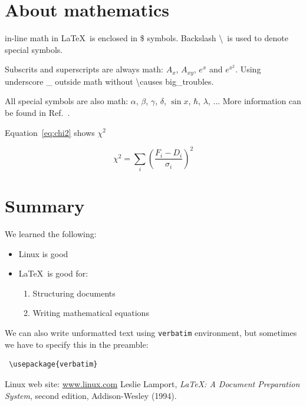 \documentclass[a4paper,10pt,twoside]{article}
\begin{document}
 \newpage


  \section{About mathematics}
  \label{sec:math}
  
  in-line math in \LaTeX \ is enclosed in \$ symbols. Backslash \textbackslash \ is used to denote special symbols. 
  
  Subscrits and superscripts are always math: $A_x$, $A_{xy}$, $e^x$ and $e^{x^2}$. Using underscore \_ outside math without \textbackslash causes big\_troubles.
  
  All special symbols are also math: $\alpha$, $\beta$, $\gamma$, $\delta$, $\sin x$, $\hbar$, $\lambda$, $\ldots$ More information can be found in Ref.~\cite{latex}.
  
  Equation~\ref{eq:chi2} shows $\chi^2$
  
  \begin{equation}
   \label{eq:chi2}
    \chi^2 = \sum\limits_i \left(\frac{F_i-D_i}{\sigma_i}\right)^2
  \end{equation}

 \section{Summary}
  \label{sec:sum}
   We learned the following:
   \begin{itemize}
    \item Linux is good
    \item \LaTeX \ is good for:
    \begin{enumerate}
     \item Structuring documents
     \item Writing mathematical equations
    \end{enumerate}

   \end{itemize}

We can also write unformatted text using \texttt{verbatim} environment, but sometimes we have to specify this in the preamble:
\begin{verbatim}
 \usepackage{verbatim}
\end{verbatim}

   
   
 \begin{thebibliography}{99}
   Linux web site: \url{www.linux.com}
   Leslie Lamport, \textsl{LaTeX: A Document Preparation System}, second edition, Addison-Wesley (1994).
 \end{thebibliography}
\end{document}
